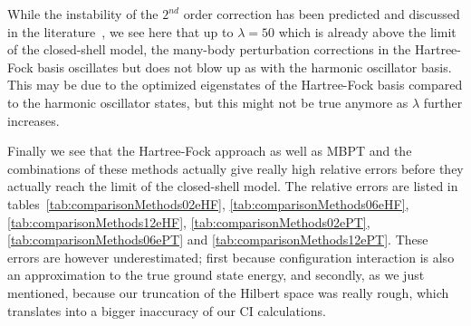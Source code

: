 While the instability of the $2^{nd}$ order correction has been predicted and discussed in the literature~\cite{Raimes1972}, we see here that up to $\lambda=50$ which is already above the limit of the closed-shell model, the many-body perturbation corrections in the Hartree-Fock basis oscillates but does not blow up as with the harmonic oscillator basis. This may be due to the optimized eigenstates of the Hartree-Fock basis compared to the harmonic oscillator states, but this might not be true anymore as  $\lambda$ further increases.

Finally we see that the Hartree-Fock approach as well as MBPT and the combinations of these methods actually give really high relative errors before they actually reach the limit of the closed-shell model. The relative errors are listed in tables~\ref{tab:comparisonMethods02eHF}, \ref{tab:comparisonMethods06eHF}, \ref{tab:comparisonMethods12eHF}, \ref{tab:comparisonMethods02ePT}, \ref{tab:comparisonMethods06ePT} and \ref{tab:comparisonMethods12ePT}. These errors are however underestimated; first because configuration interaction is also an approximation to the true ground state energy, and secondly, as we just mentioned, because our truncation of the Hilbert space was really rough, which translates into a bigger inaccuracy of our  CI calculations.





